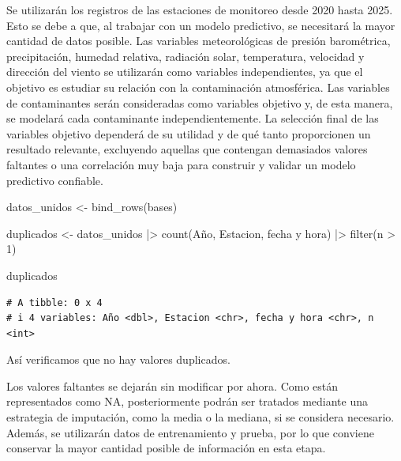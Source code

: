 \documentclass[
  letterpaper,
  DIV=11,
  numbers=noendperiod]{scrartcl}
\newenvironment{Shaded}{\begin{snugshade}}{\end{snugshade}}
\newcommand{\AttributeTok}[1]{\textcolor[rgb]{0.40,0.45,0.13}{#1}}
\newcommand{\DecValTok}[1]{\textcolor[rgb]{0.68,0.00,0.00}{#1}}
\newcommand{\FunctionTok}[1]{\textcolor[rgb]{0.28,0.35,0.67}{#1}}
\newcommand{\NormalTok}[1]{\textcolor[rgb]{0.00,0.23,0.31}{#1}}
\newcommand{\OtherTok}[1]{\textcolor[rgb]{0.00,0.23,0.31}{#1}}
\newcommand{\SpecialCharTok}[1]{\textcolor[rgb]{0.37,0.37,0.37}{#1}}
\newcommand{\StringTok}[1]{\textcolor[rgb]{0.13,0.47,0.30}{#1}}
\begin{document}
Se utilizarán los registros de las estaciones de monitoreo desde 2020
hasta 2025. Esto se debe a que, al trabajar con un modelo predictivo, se
necesitará la mayor cantidad de datos posible. Las variables
meteorológicas de presión barométrica, precipitación, humedad relativa,
radiación solar, temperatura, velocidad y dirección del viento se
utilizarán como variables independientes, ya que el objetivo es estudiar
su relación con la contaminación atmosférica. Las variables de
contaminantes serán consideradas como variables objetivo y, de esta
manera, se modelará cada contaminante independientemente. La selección
final de las variables objetivo dependerá de su utilidad y de qué tanto
proporcionen un resultado relevante, excluyendo aquellas que contengan
demasiados valores faltantes o una correlación muy baja para construir y
validar un modelo predictivo confiable.

\begin{Shaded}
\begin{Highlighting}[]
\NormalTok{datos\_unidos }\OtherTok{\textless{}{-}} \FunctionTok{bind\_rows}\NormalTok{(bases)}

\NormalTok{duplicados }\OtherTok{\textless{}{-}}\NormalTok{ datos\_unidos }\SpecialCharTok{|\textgreater{}}
  \FunctionTok{count}\NormalTok{(Año, Estacion, }\StringTok{\textasciigrave{}}\AttributeTok{fecha y hora}\StringTok{\textasciigrave{}}\NormalTok{) }\SpecialCharTok{|\textgreater{}}
  \FunctionTok{filter}\NormalTok{(n }\SpecialCharTok{\textgreater{}} \DecValTok{1}\NormalTok{)}

\NormalTok{duplicados}
\end{Highlighting}
\end{Shaded}

\begin{verbatim}
# A tibble: 0 x 4
# i 4 variables: Año <dbl>, Estacion <chr>, fecha y hora <chr>, n <int>
\end{verbatim}

Así verificamos que no hay valores duplicados.

Los valores faltantes se dejarán sin modificar por ahora. Como están
representados como NA, posteriormente podrán ser tratados mediante una
estrategia de imputación, como la media o la mediana, si se considera
necesario. Además, se utilizarán datos de entrenamiento y prueba, por lo
que conviene conservar la mayor cantidad posible de información en esta
etapa.
\end{document}
